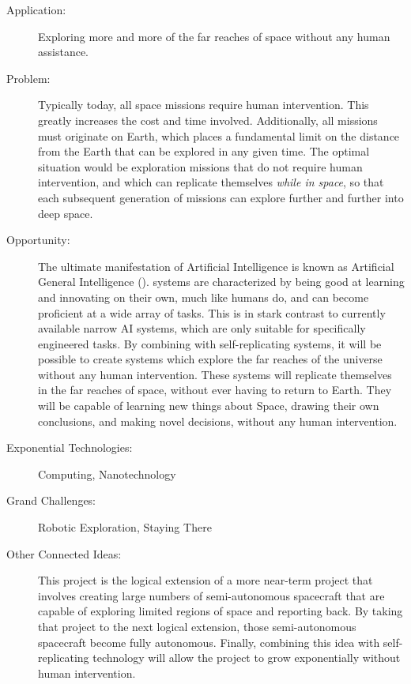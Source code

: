 \begin{description}
\item[Application:]

Exploring more and more of the far reaches of space without any human
assistance.


\item[Problem:]

Typically today, all space missions require human intervention. This
greatly increases the cost and time involved. Additionally, all missions
must originate on Earth, which places a fundamental limit on the distance
from the Earth that can be explored in any given time. The optimal
situation would be exploration missions that do not require human
intervention, and which can replicate themselves \emph{while in space},
so that each subsequent generation of missions can explore further
and further into deep space.


\item[Opportunity:]

The ultimate manifestation of Artificial Intelligence is known as
Artificial General Intelligence ().  systems are characterized
by being good at learning and innovating on their own, much like humans
do, and can become proficient at a wide array of tasks. This is in
stark contrast to currently available narrow AI systems, which are
only suitable for specifically engineered tasks. By combining 
with self-replicating systems, it will be possible to create systems
which explore the far reaches of the universe without any human intervention.
These systems will replicate themselves in the far reaches of space,
without ever having to return to Earth. They will be capable of learning
new things about Space, drawing their own conclusions, and making
novel decisions, without any human intervention.


\item[Exponential Technologies:]

Computing, Nanotechnology


\item[Grand Challenges:]

Robotic Exploration, Staying There


\item[Other Connected Ideas:]

This project is the logical extension of a more near-term project
that involves creating large numbers of semi-autonomous spacecraft
that are capable of exploring limited regions of space and reporting
back. By taking that project to the next logical extension, those
semi-autonomous spacecraft become fully autonomous. Finally, combining
this idea with self-replicating technology will allow the project
to grow exponentially without human intervention.



\end{description}

